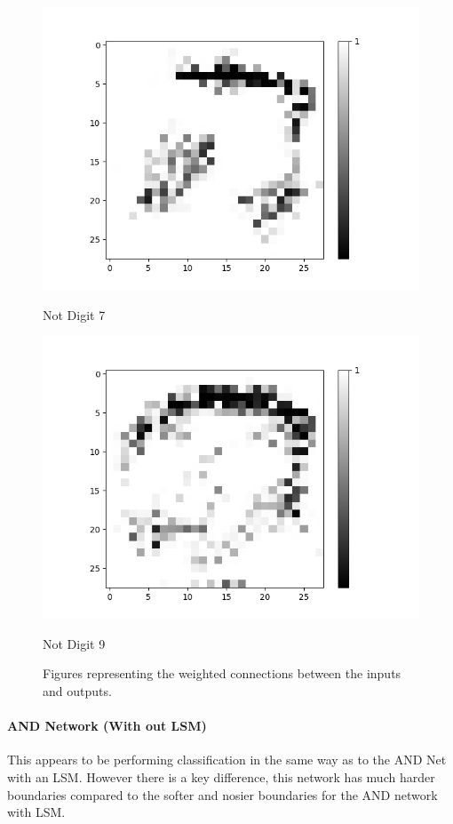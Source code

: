\begin{figure}[H]
\begin{minipage}[b]{0.19\textwidth}
		\includegraphics[width=\textwidth]{AND(LSM)/Negative/Layer0-Neuron-7.png}
		\caption{Not Digit 7}
	\end{minipage}
	\begin{minipage}[b]{0.19\textwidth}
		\includegraphics[width=\textwidth]{AND(LSM)/Negative/Layer0-Neuron-9.png}
		\caption{Not Digit 9}
	\end{minipage}
	\hfill
	\caption{Figures representing the weighted connections between the inputs and outputs.}
\end{figure}

\paragraph{AND Network (With out LSM)}
This appears to be performing classification in the same way as to the AND Net with an LSM. However there is a key difference, this network has much harder boundaries compared to the softer and nosier boundaries for the AND network with LSM.


